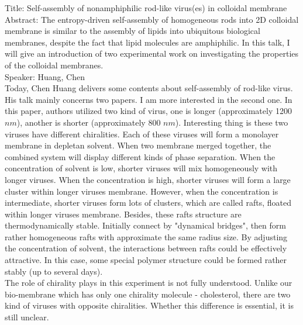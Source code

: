 \documentclass[fontsize=11pt, %
                             paper=a4, %
                             twoside, %
                             captions=tableheading,
                             index=totoc,
                             hyperref]{labbook}
\begin{document}
\begin{addmargin}[4cm]{0cm}
Title: Self-assembly of nonamphiphilic rod-like virus(es) in colloidal membrane\\
Abstract: The entropy-driven self-assembly of homogeneous rods into 2D colloidal membrane is similar to the assembly of lipids into ubiquitous biological membranes, despite the fact that lipid molecules are amphiphilic. In this talk, I will give an introduction of two experimental work on investigating the properties of the colloidal membranes.\\
Speaker: Huang, Chen\\
Today, Chen Huang delivers some contents about self-assembly of rod-like virus. His talk mainly concerns two papers. I am more interested in the second one\cite{Sharma2014}. In this paper, authors utilized two kind of virus, one is longer (approximately 1200 $nm$), another is shorter (approximately 800 $nm$). Interesting thing is these two viruses have different chiralities. Each of these viruses will form a monolayer membrane in depletan solvent. When two membrane merged together, the combined system will display different kinds of phase separation. When the concentration of solvent is low, shorter viruses will mix homogeneously with longer viruses. When the concentration is high, shorter viruses will form a large cluster within longer viruses membrane. However, when the concentration is intermediate, shorter viruses form lots  of clusters, which are called rafts, floated within longer viruses membrane. Besides, these rafts structure are thermodynamically stable. Initially connect by "dynamical bridges", then form rather homogeneous rafts with approximate the same radius size. By adjusting the concentration of solvent, the interactions between rafts could be effectively attractive. In this case, some special polymer structure could be formed rather stably (up to several days).\\
The role of chirality plays in this experiment is not fully understood. Unlike our bio-membrane which has only one chirality molecule - cholesterol, there are two kind of viruses with opposite chiralities. Whether this difference is essential, it is still unclear.


\end{addmargin}
\end{document}
